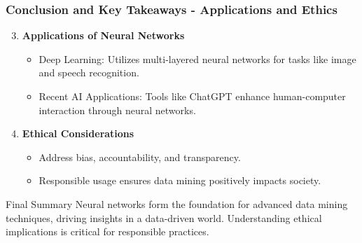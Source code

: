 \documentclass[aspectratio=169]{beamer}
\begin{document}
\begin{frame}[fragile]
    \frametitle{Conclusion and Key Takeaways - Applications and Ethics}
    
    \begin{enumerate}
        \setcounter{enumi}{2} %
        
        \item \textbf{Applications of Neural Networks}
            \begin{itemize}
                \item Deep Learning: Utilizes multi-layered neural networks for tasks like image and speech recognition.
                \item Recent AI Applications: Tools like ChatGPT enhance human-computer interaction through neural networks.
            \end{itemize}

        \item \textbf{Ethical Considerations}
            \begin{itemize}
                \item Address bias, accountability, and transparency.
                \item Responsible usage ensures data mining positively impacts society.
            \end{itemize}
    \end{enumerate}

    \begin{block}{Final Summary}
        Neural networks form the foundation for advanced data mining techniques, driving insights in a data-driven world. Understanding ethical implications is critical for responsible practices.
    \end{block}

\end{frame}
\end{document}
